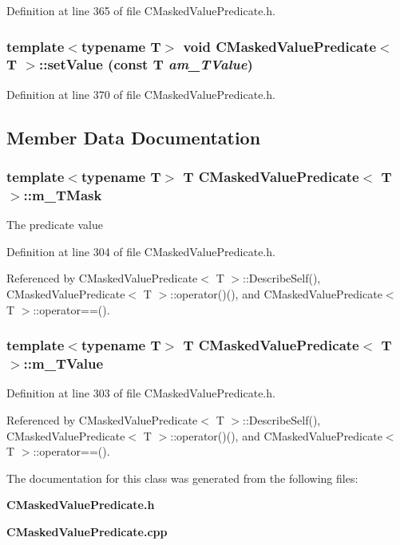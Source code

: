 Definition at line 365 of file CMasked\-Value\-Predicate.h.
\subsubsection{\setlength{\rightskip}{0pt plus 5cm}template$<$typename T$>$ void CMasked\-Value\-Predicate$<$ T $>$::set\-Value (const T {\em am\_\-TValue})\hspace{0.3cm}{\tt  [inline, protected]}}\label{classCMaskedValuePredicate_b1}




Definition at line 370 of file CMasked\-Value\-Predicate.h.

\subsection{Member Data Documentation}
\subsubsection{\setlength{\rightskip}{0pt plus 5cm}template$<$typename T$>$ T CMasked\-Value\-Predicate$<$ T $>$::m\_\-TMask\hspace{0.3cm}{\tt  [private]}}\label{classCMaskedValuePredicate_o1}


The predicate value 

Definition at line 304 of file CMasked\-Value\-Predicate.h.

Referenced by CMasked\-Value\-Predicate$<$ T $>$::Describe\-Self(), CMasked\-Value\-Predicate$<$ T $>$::operator()(), and CMasked\-Value\-Predicate$<$ T $>$::operator==().
\subsubsection{\setlength{\rightskip}{0pt plus 5cm}template$<$typename T$>$ T CMasked\-Value\-Predicate$<$ T $>$::m\_\-TValue\hspace{0.3cm}{\tt  [private]}}\label{classCMaskedValuePredicate_o0}




Definition at line 303 of file CMasked\-Value\-Predicate.h.

Referenced by CMasked\-Value\-Predicate$<$ T $>$::Describe\-Self(), CMasked\-Value\-Predicate$<$ T $>$::operator()(), and CMasked\-Value\-Predicate$<$ T $>$::operator==().

The documentation for this class was generated from the following files:\begin{CompactItemize}
\item 
{\bf CMasked\-Value\-Predicate.h}\item 
{\bf CMasked\-Value\-Predicate.cpp}\end{CompactItemize}
